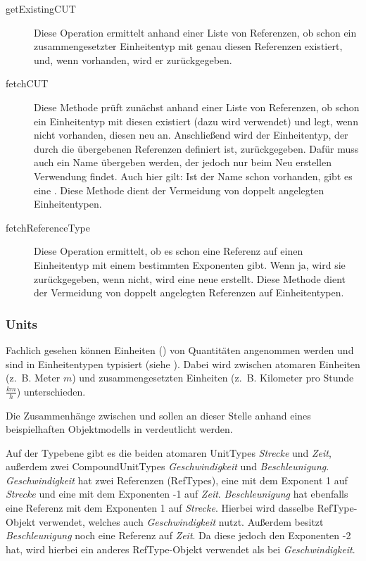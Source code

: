 \begin{description}
\item[getExistingCUT]
Diese Operation ermittelt anhand einer Liste von Referenzen, ob schon ein zusammengesetzter Einheitentyp mit genau diesen Referenzen existiert, und, wenn vorhanden, wird er zurückgegeben. 
\item[fetchCUT]
Diese Methode prüft zunächst anhand einer Liste von Referenzen, ob schon ein Einheitentyp mit diesen existiert (dazu wird  verwendet) und legt, wenn nicht vorhanden, diesen neu an. Anschließend wird der Einheitentyp, der durch die übergebenen Referenzen definiert ist, zurückgegeben. Dafür muss auch ein Name übergeben werden, der jedoch nur beim Neu erstellen Verwendung findet. Auch hier gilt: Ist der Name schon vorhanden, gibt es eine . Diese Methode dient der Vermeidung von doppelt angelegten Einheitentypen.
\item[fetchReferenceType]
Diese Operation ermittelt, ob es schon eine Referenz auf einen Einheitentyp mit einem bestimmten Exponenten gibt. Wenn ja, wird sie zurückgegeben, wenn nicht, wird eine neue erstellt. Diese Methode dient der Vermeidung von doppelt angelegten Referenzen auf Einheitentypen.
\end{description}


\subsubsection{Units}
Fachlich gesehen können Einheiten () von Quantitäten angenommen werden und sind in Einheitentypen typisiert (siehe ).
Dabei wird zwischen atomaren Einheiten (z.~B. Meter $m$) und zusammengesetzten Einheiten (z.~B. Kilometer pro Stunde $\frac{km}{h}$) unterschieden.


Die Zusammenhänge zwischen  und  sollen an dieser Stelle anhand eines beispielhaften Objektmodells in  verdeutlicht werden.


Auf der Typebene gibt es die beiden atomaren UnitTypes \textit{Strecke} und \textit{Zeit}, außerdem zwei CompoundUnitTypes \textit{Geschwindigkeit} und \textit{Beschleunigung}. \textit{Geschwindigkeit} hat zwei Referenzen (RefTypes), eine mit dem Exponent 1 auf \textit{Strecke} und eine mit dem Exponenten -1 auf \textit{Zeit}. \textit{Beschleunigung} hat ebenfalls eine Referenz mit dem Exponenten 1 auf \textit{Strecke}. Hierbei wird dasselbe RefType-Objekt verwendet, welches auch \textit{Geschwindigkeit} nutzt. Außerdem besitzt \textit{Beschleunigung} noch eine Referenz auf \textit{Zeit}. Da diese jedoch den Exponenten -2 hat, wird hierbei ein anderes RefType-Objekt verwendet als bei \textit{Geschwindigkeit}.

